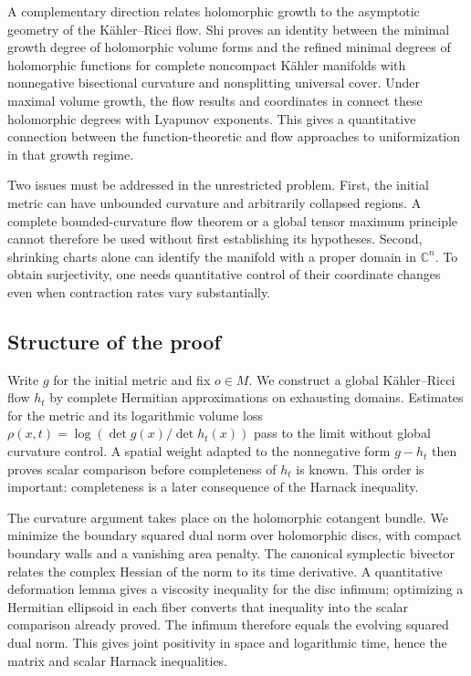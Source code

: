 \documentclass[11pt]{article}
\theoremstyle{definition}
\theoremstyle{remark}
\newcommand{\C}{\mathbb C}
\numberwithin{equation}{section}
\begin{document}
A complementary direction relates holomorphic growth to the asymptotic
geometry of the K\"ahler--Ricci flow. Shi
\cite[Theorem~1.6]{ShiMinimalDegrees} proves an identity between the
minimal growth degree of holomorphic volume forms and the refined
minimal degrees of holomorphic functions for complete noncompact K\"ahler
manifolds with nonnegative bisectional curvature and nonsplitting
universal cover. Under maximal volume growth, the flow results
and coordinates in \cite[Theorem~1.7 and Corollary~1.12]{ShiMinimalDegrees}
connect these holomorphic degrees with Lyapunov exponents. This gives a
quantitative connection between the function-theoretic and flow
approaches to uniformization in that growth regime.

Two issues must be addressed in the unrestricted problem.
First, the initial metric can have unbounded curvature and arbitrarily
collapsed regions. A complete bounded-curvature flow theorem or a
global tensor maximum principle cannot therefore be used without
first establishing its hypotheses. Second, shrinking charts alone
can identify the manifold with a proper domain in $\C^n$.
To obtain surjectivity, one needs quantitative control of their
coordinate changes even when contraction rates vary substantially.

\subsection{Structure of the proof}

Write $g$ for the initial metric and fix $o\in M$.
We construct a global K\"ahler--Ricci flow $h_t$ by complete Hermitian
approximations on exhausting domains.  Estimates for the metric and
its logarithmic volume loss
$\rho(x,t)=\log(\det g(x)/\det h_t(x))$ pass to the limit
without global curvature control. A spatial weight adapted to the nonnegative form $g-h_t$
then proves scalar comparison before completeness of $h_t$ is known.
This order is important: completeness is a later consequence of
the Harnack inequality.

The curvature argument takes place on the holomorphic cotangent
bundle. We minimize the boundary squared dual norm over holomorphic
discs, with compact boundary walls and a vanishing area penalty.
The canonical symplectic bivector relates the complex Hessian of
the norm to its time derivative. A quantitative deformation lemma
gives a viscosity inequality for the disc infimum; optimizing a
Hermitian ellipsoid in each fiber converts that inequality into
the scalar comparison already proved. The infimum therefore equals
the evolving squared dual norm. This gives joint positivity in space and
logarithmic time, hence the matrix and scalar Harnack inequalities.
\end{document}
